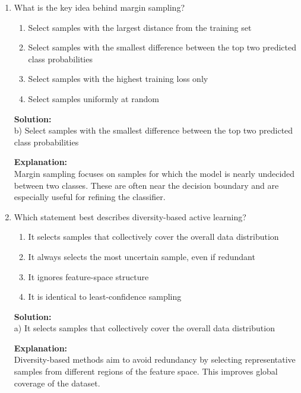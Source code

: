 \documentclass{article}
\begin{document}
\begin{enumerate}
\vspace{1em}

\item What is the key idea behind margin sampling?

\begin{enumerate}
    \item Select samples with the largest distance from the training set
    \item Select samples with the smallest difference between the top two predicted class probabilities
    \item Select samples with the highest training loss only
    \item Select samples uniformly at random
\end{enumerate}

\textbf{Solution:} \\
b) Select samples with the smallest difference between the top two predicted class probabilities

\textbf{Explanation:} \\
Margin sampling focuses on samples for which the model is nearly undecided between two classes. These are often near the decision boundary and are especially useful for refining the classifier.

\vspace{1em}

\item Which statement best describes diversity-based active learning?

\begin{enumerate}
    \item It selects samples that collectively cover the overall data distribution
    \item It always selects the most uncertain sample, even if redundant
    \item It ignores feature-space structure
    \item It is identical to least-confidence sampling
\end{enumerate}

\textbf{Solution:} \\
a) It selects samples that collectively cover the overall data distribution

\textbf{Explanation:} \\
Diversity-based methods aim to avoid redundancy by selecting representative samples from different regions of the feature space. This improves global coverage of the dataset.


\end{enumerate}
\end{document}
